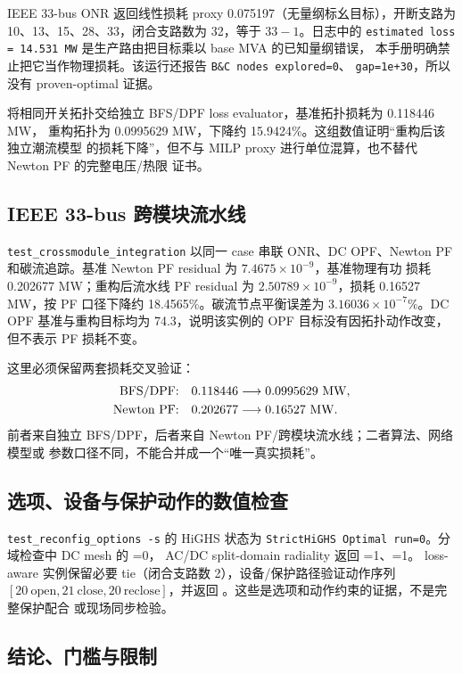 IEEE 33-bus ONR 返回线性损耗 proxy 0.075197（无量纲标幺目标），开断支路为
10、13、15、28、33，闭合支路数为 32，等于 \(33-1\)。日志中的
\texttt{estimated loss = 14.531 MW} 是生产路由把目标乘以 base MVA 的已知量纲错误，
本手册明确禁止把它当作物理损耗。该运行还报告 \texttt{B\&C nodes explored=0}、
\texttt{gap=1e+30}，所以没有 proven-optimal 证据。

将相同开关拓扑交给独立 BFS/DPF loss evaluator，基准拓扑损耗为 0.118446 MW，
重构拓扑为 0.0995629 MW，下降约 15.9424\%。这组数值证明“重构后该独立潮流模型
的损耗下降”，但不与 MILP proxy 进行单位混算，也不替代 Newton PF 的完整电压/热限
证书。

\subsection{IEEE 33-bus 跨模块流水线}

\texttt{test\_crossmodule\_integration} 以同一 case 串联 ONR、DC OPF、Newton PF
和碳流追踪。基准 Newton PF residual 为 \(7.4675\times10^{-9}\)，基准物理有功
损耗 0.202677 MW；重构后流水线 PF residual 为 \(2.50789\times10^{-9}\)，损耗
0.16527 MW，按 PF 口径下降约 18.4565\%。碳流节点平衡误差为
\(3.16036\times10^{-7}\%\)。DC OPF 基准与重构目标均为 74.3，说明该实例的
OPF 目标没有因拓扑动作改变，但不表示 PF 损耗不变。

这里必须保留两套损耗交叉验证：
\[
\begin{aligned}
\text{BFS/DPF:}\quad &0.118446\longrightarrow0.0995629\ {\rm MW},\\
\text{Newton PF:}\quad &0.202677\longrightarrow0.16527\ {\rm MW}.
\end{aligned}
\]
前者来自独立 BFS/DPF，后者来自 Newton PF/跨模块流水线；二者算法、网络模型或
参数口径不同，不能合并成一个“唯一真实损耗”。

\subsection{选项、设备与保护动作的数值检查}

\texttt{test\_reconfig\_options -s} 的 HiGHS 状态为
\texttt{StrictHiGHS Optimal run=0}。分域检查中 DC mesh 的 =0，
AC/DC split-domain radiality 返回 =1、=1。
loss-aware 实例保留必要 tie（闭合支路数 2），设备/保护路径验证动作序列
\([20\ \mathrm{open},21\ \mathrm{close},20\ \mathrm{reclose}]\)，并返回
。这些是选项和动作约束的证据，不是完整保护配合
或现场同步检验。

\subsection{结论、门槛与限制}


